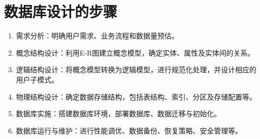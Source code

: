 \section{数据库设计的步骤}
\begin{enumerate}
    \item 需求分析：明确用户需求、业务流程和数据量预估。
    \item 概念结构设计：利用E-R图建立概念模型，确定实体、属性及实体间的关系。
    \item 逻辑结构设计：将概念模型转换为逻辑模型，进行规范化处理，并设计相应的用户子模式。
    \item 物理结构设计：确定数据存储结构，包括表结构、索引、分区及存储配置等。
    \item 数据库实施：搭建数据库环境，部署数据库、数据迁移与初始化。
    \item 数据库运行与维护：进行性能调优、数据备份、恢复策略、安全管理等。
\end{enumerate}